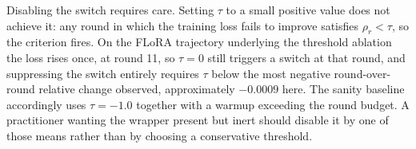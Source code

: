 Disabling the switch requires care. Setting $\tau$ to a small positive value does not achieve it: any round in which the training loss fails to improve satisfies $\rho_r < \tau$, so the criterion fires. On the FLoRA trajectory underlying the threshold ablation the loss rises once, at round 11, so $\tau{=}0$ still triggers a switch at that round, and suppressing the switch entirely requires $\tau$ below the most negative round-over-round relative change observed, approximately $-0.0009$ here. The sanity baseline accordingly uses $\tau{=}-1.0$ together with a warmup exceeding the round budget. A practitioner wanting the wrapper present but inert should disable it by one of those means rather than by choosing a conservative threshold.

